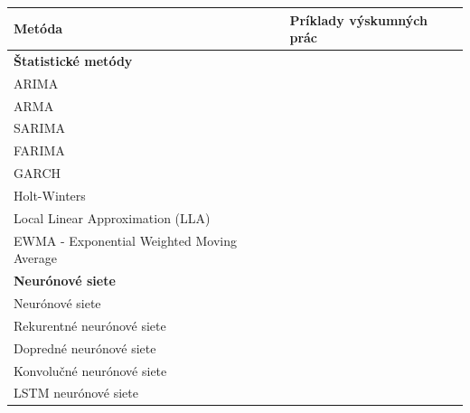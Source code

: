 \documentclass[thesismargins, thesislinespacing, openright, upjsfrontpage, combineabstracts]{rnthesis}
\begin{document}
\begin{table}[]
    \centering
    \begin{tabular}{ | p{7cm} | p{7cm} | }
         \hline \textbf{Metóda} & \textbf{Príklady výskumných prác} \\

         \hline \multicolumn{2}{l}{\textbf{Štatistické metódy}} \\
         \hline ARIMA & \cite{madan2018predicting,papagiannaki2005long,condon2008analysis,roumani2015time,tang2018disclosure,tang2017big,pokhrel2017cybersecurity,werner2017time,cortez2012multi} \\
         \hline ARMA & \cite{wei2012intrusion,sang2002predictability} \\
         \hline SARIMA & \cite{tang2016exploiting,condon2008analysis,roumani2015time,tang2018disclosure} \\
         \hline FARIMA & \cite{zhan2015predicting} \\
         \hline GARCH & \cite{tang2016exploiting,tang2018disclosure,tang2017big} \\
         \hline Holt-Winters & \cite{cortez2012multi,roumani2015time} \\
         \hline Local Linear Approximation (LLA) & \cite{hasegawa2001applications} \\
         \hline EWMA - Exponential Weighted Moving Average & \cite{soldo2011blacklisting} \\

         
         
         \hline \multicolumn{2}{l}{\textbf{Neurónové siete}} \\
         \hline Neurónové siete & \cite{Leau2015,wang2008internet} \\
         \hline Rekurentné neurónové siete & \cite{madan2018predicting,fang2019deep} \\
         \hline Dopredné neurónové siete & \cite{cortez2012multi,pokhrel2017cybersecurity} \\
         \hline Konvolučné neurónové siete & \cite{millar2019using} \\
         \hline LSTM neurónové siete & \cite{fang2019deep} \\
         

\end{tabular}
\end{table}
\end{document}
